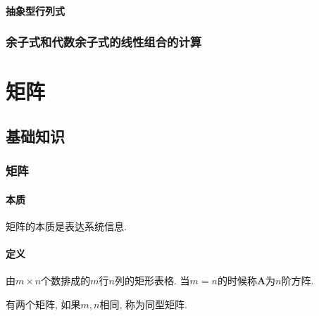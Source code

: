 \subsubsection{抽象型行列式}
\subsection{余子式和代数余子式的线性组合的计算}
\chapter{矩阵}
\section{基础知识}
\subsection{矩阵}
\subsubsection{本质}
矩阵的本质是表达系统信息.
\subsubsection{定义}
由$ m\times n $个数排成的$ m $行$ n $列的矩形表格. 当$ m=n $的时候称$ \bm{A} $为$ n $阶方阵.\par 有两个矩阵, 如果$ m,n $相同, 称为同型矩阵.
